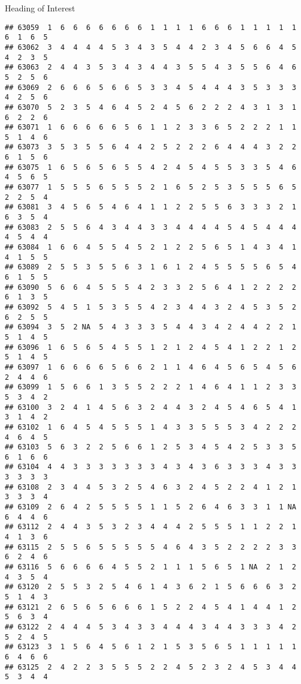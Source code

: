 \documentclass[
  ignorenonframetext,
]{beamer}
\begin{document}
\begin{frame}[fragile]{Heading of Interest}
\begin{verbatim}
## 63059  1  6  6  6  6  6  6  6  1  1  1  1  6  6  6  1  1  1  1  1  6  1  6  5
## 63062  3  4  4  4  4  5  3  4  3  5  4  4  2  3  4  5  6  6  4  5  4  2  3  5
## 63063  2  4  4  3  5  3  4  3  4  4  3  5  5  4  3  5  5  6  4  6  5  2  5  6
## 63069  2  6  6  6  5  6  6  5  3  3  4  5  4  4  4  3  5  3  3  3  4  2  5  6
## 63070  5  2  3  5  4  6  4  5  2  4  5  6  2  2  2  4  3  1  3  1  6  2  2  6
## 63071  1  6  6  6  6  6  5  6  1  1  2  3  3  6  5  2  2  2  1  1  5  1  4  6
## 63073  3  5  3  5  5  6  4  4  2  5  2  2  2  6  4  4  4  3  2  2  6  1  5  6
## 63075  1  6  5  6  5  6  5  5  4  2  4  5  4  5  5  3  3  5  4  6  4  5  6  5
## 63077  1  5  5  5  6  5  5  5  2  1  6  5  2  5  3  5  5  5  6  5  2  2  5  4
## 63081  3  4  5  6  5  4  6  4  1  1  2  2  5  5  6  3  3  3  2  1  6  3  5  4
## 63083  2  5  5  6  4  3  4  4  3  3  4  4  4  4  5  4  5  4  4  4  4  5  4  4
## 63084  1  6  6  4  5  5  4  5  2  1  2  2  5  6  5  1  4  3  4  1  4  1  5  5
## 63089  2  5  5  3  5  5  6  3  1  6  1  2  4  5  5  5  5  6  5  4  6  1  5  5
## 63090  5  6  6  4  5  5  5  4  2  3  3  2  5  6  4  1  2  2  2  2  6  1  3  5
## 63092  5  4  5  1  5  3  5  5  4  2  3  4  4  3  2  4  5  3  5  2  6  2  5  5
## 63094  3  5  2 NA  5  4  3  3  3  5  4  4  3  4  2  4  4  2  2  1  5  1  4  5
## 63096  1  6  5  6  5  4  5  5  1  2  1  2  4  5  4  1  2  2  1  2  5  1  4  5
## 63097  1  6  6  6  6  5  6  6  2  1  1  4  6  4  5  6  5  4  5  6  2  4  4  6
## 63099  1  5  6  6  1  3  5  5  2  2  2  1  4  6  4  1  1  2  3  3  5  3  4  2
## 63100  3  2  4  1  4  5  6  3  2  4  4  3  2  4  5  4  6  5  4  1  3  1  4  2
## 63102  1  6  4  5  4  5  5  5  1  4  3  3  5  5  5  3  4  2  2  2  4  6  4  5
## 63103  5  6  3  2  2  5  6  6  1  2  5  3  4  5  4  2  5  3  3  5  6  1  6  6
## 63104  4  4  3  3  3  3  3  3  3  4  3  4  3  6  3  3  3  4  3  3  3  3  3  3
## 63108  2  3  4  4  5  3  2  5  4  6  3  2  4  5  2  2  4  1  2  1  3  3  3  4
## 63109  2  6  4  2  5  5  5  5  1  1  5  2  6  4  6  3  3  1  1 NA  6  4  4  6
## 63112  2  4  4  3  5  3  2  3  4  4  4  2  5  5  5  1  1  2  2  1  4  1  3  6
## 63115  2  5  5  6  5  5  5  5  5  4  6  4  3  5  2  2  2  2  3  3  6  2  4  6
## 63116  5  6  6  6  6  4  5  5  2  1  1  1  5  6  5  1 NA  2  1  2  4  3  5  4
## 63120  2  5  5  3  2  5  4  6  1  4  3  6  2  1  5  6  6  6  3  2  5  1  4  3
## 63121  2  6  5  6  5  6  6  6  1  5  2  2  4  5  4  1  4  4  1  2  5  6  3  4
## 63122  2  4  4  4  5  3  4  3  3  4  4  4  3  4  4  3  3  3  4  2  5  2  4  5
## 63123  3  1  5  6  4  5  6  1  2  1  5  3  5  6  5  1  1  1  1  1  6  4  6  6
## 63125  2  4  2  2  3  5  5  5  2  2  4  5  2  3  2  4  5  3  4  4  5  3  4  4

\end{verbatim}
\end{frame}
\end{document}
